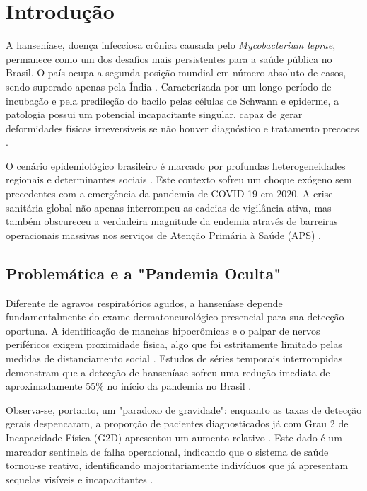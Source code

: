 \chapter{Introdução}


A hanseníase, doença infecciosa crônica causada pelo \textit{Mycobacterium leprae}, permanece como um dos desafios mais persistentes para a saúde pública no Brasil. O país ocupa a segunda posição mundial em número absoluto de casos, sendo superado apenas pela Índia \cite{who_hans_2021, boletim2025hanseniase}. Caracterizada por um longo período de incubação e pela predileção do bacilo pelas células de Schwann e epiderme, a patologia possui um potencial incapacitante singular, capaz de gerar deformidades físicas irreversíveis se não houver diagnóstico e tratamento precoces \cite{lepra_ref_pilar, nery2021physical}.

O cenário epidemiológico brasileiro é marcado por profundas heterogeneidades regionais e determinantes sociais \cite{who_hans_2021}. Este contexto sofreu um choque exógeno sem precedentes com a emergência da pandemia de COVID-19 em 2020. A crise sanitária global não apenas interrompeu as cadeias de vigilância ativa, mas também obscureceu a verdadeira magnitude da endemia através de barreiras operacionais massivas nos serviços de Atenção Primária à Saúde (APS) \cite{sousa2025, chaves2022impact}.

\section{Problemática e a "Pandemia Oculta"}

Diferente de agravos respiratórios agudos, a hanseníase depende fundamentalmente do exame dermatoneurológico presencial para sua detecção oportuna. A identificação de manchas hipocrômicas e o palpar de nervos periféricos exigem proximidade física, algo que foi estritamente limitado pelas medidas de distanciamento social \cite{frade2022hidden}. Estudos de séries temporais interrompidas demonstram que a detecção de hanseníase sofreu uma redução imediata de aproximadamente 55\% no início da pandemia no Brasil \cite{sousa2025}.

Observa-se, portanto, um "paradoxo de gravidade": enquanto as taxas de detecção gerais despencaram, a proporção de pacientes diagnosticados já com Grau 2 de Incapacidade Física (G2D) apresentou um aumento relativo \cite{boletim2025hanseniase, impact_minas_2025}. Este dado é um marcador sentinela de falha operacional, indicando que o sistema de saúde tornou-se reativo, identificando majoritariamente indivíduos que já apresentam sequelas visíveis e incapacitantes \cite{freitas2025evaluating}.

